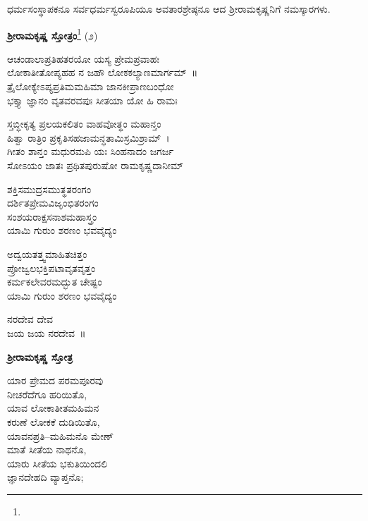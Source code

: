 ಧರ್ಮಸಂಸ್ಥಾಪಕನೂ ಸರ್ವಧರ್ಮಸ್ವರೂಪಿಯೂ ಅವತಾರಶ್ರೇಷ್ಠನೂ ಆದ ಶ‍್ರೀರಾಮಕೃಷ್ಣನಿಗೆ ನಮಸ್ಕಾರಗಳು.

\begin{center}
\textbf{ಶ‍್ರೀರಾಮಕೃಷ್ಣ ಸ್ತೋತ್ರಂ}\footnote{} (೨)
\end{center}

\begin{myquote}
ಆಚಂಡಾಲಾಪ್ರತಿಹತರಯೋ ಯಸ್ಯ ಪ್ರೇಮಪ್ರವಾಹಃ\\ಲೋಕಾತೀತೋಪ್ಯಹಹ ನ ಜಹೌ ಲೋಕಕಲ್ಯಾಣಮಾರ್ಗಮ್~॥\\
ತ್ರೈಲೋಕ್ಯೇಽಪ್ಯಪ್ರತಿಮಮಹಿಮಾ ಜಾನಕೀಪ್ರಾಣಬಂಧೋ\\ಭಕ್ತ್ಯಾ ಜ್ಞಾನಂ ವೃತವರವಪುಃ ಸೀತಯಾ ಯೋ ಹಿ ರಾಮಃ
\end{myquote}


\begin{myquote}
ಸ್ತಬ್ಧೀಕೃತ್ಯ ಪ್ರಲಯಕಲಿತಂ ವಾಹವೋತ್ಥಂ ಮಹಾನ್ತಂ\\ಹಿತ್ವಾ ರಾತ್ರಿಂ ಪ್ರಕೃತಿಸಹಜಾಮನ್ಧತಾಮಿಸ್ರಮಿಶ್ರಾಮ್~।\\
ಗೀತಂ ಶಾನ್ತಂ ಮಧುರಮಪಿ ಯಃ ಸಿಂಹನಾದಂ ಜಗರ್ಜ\\ಸೋಽಯಂ ಜಾತಃ ಪ್ರಥಿತಪುರುಷೋ ರಾಮಕೃಷ್ಣದಾನೀಮ್
\end{myquote}


\begin{myquote}
ಶಕ್ತಿಸಮುದ್ರಸಮುತ್ಥತರಂಗಂ\\ದರ್ಶಿತಪ್ರೇಮವಿಜೃಂಭಿತರಂಗಂ\\ಸಂಶಯರಾಕ್ಷಸನಾಶಮಹಾಸ್ತ್ರಂ\\ಯಾಮಿ ಗುರುಂ ಶರಣಂ ಭವವೈದ್ಯಂ
\end{myquote}


\begin{myquote}
ಅದ್ವಯತತ್ತ್ವಮಾಹಿತಚಿತ್ತಂ\\ಪ್ರೋಜ್ವಲಭಕ್ತಿಪಟಾವೃತವೃತ್ತಂ\\ಕರ್ಮಕಲೇವರಮದ್ಭುತ ಚೇಷ್ಟಂ\\ಯಾಮಿ ಗುರುಂ ಶರಣಂ ಭವವೈದ್ಯಂ
\end{myquote}


\begin{myquote}
ನರದೇವ ದೇವ\\ಜಯ ಜಯ ನರದೇವ~॥
\end{myquote}

\begin{center}
\textbf{ಶ‍್ರೀರಾಮಕೃಷ್ಣ ಸ್ತೋತ್ರ}
\end{center}

\begin{myquote}
ಯಾರ ಪ್ರೇಮದ ಪರಮಪೂರವು\\ನೀಚರೆದೆಗೂ ಹರಿಯಿತೊ,\\ಯಾವ ಲೋಕಾತೀತಮಹಿಮನ\\ಕರುಣೆ ಲೋಕಕೆ ದುಡಿಯಿತೊ,\\ಯಾವನಪ್ರತಿ–ಮಹಿಮನೊ ಮೇಣ್\\ಮಾತೆ ಸೀತೆಯ ನಾಥನೊ,\\ಯಾರು ಸೀತೆಯ ಭಕುತಿಯಿಂದಲಿ\\ಜ್ಞಾನದೇಹದಿ ವ್ಯಾಪ್ತನೊ;
\end{myquote}

